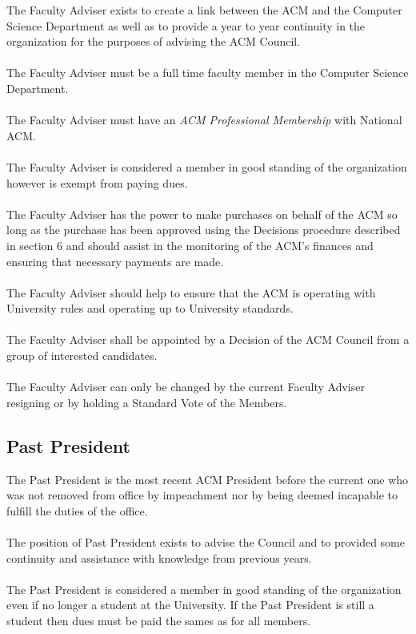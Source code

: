 \documentclass[12pt,titlepage]{article}
\begin{document}
The Faculty Adviser exists to create a link between the ACM and the Computer Science Department as well as to provide a year to year continuity in the organization for the purposes of advising the ACM Council.\\
\\
The Faculty Adviser must be a full time faculty member in the Computer Science Department.\\
\\
The Faculty Adviser must have an \emph{ACM Professional Membership} with National ACM.\\
\\
The Faculty Adviser is considered a member in good standing of the organization however is exempt from paying dues.\\
\\
The Faculty Adviser has the power to make purchases on behalf of the ACM so long as the purchase has been approved using the Decisions procedure described in section 6 and should assist in the monitoring of the ACM's finances and ensuring that necessary payments are made.\\
\\
The Faculty Adviser should help to ensure that the ACM is operating with University rules and operating up to University standards.\\
\\
The Faculty Adviser shall be appointed by a Decision of the ACM Council from a group of interested candidates.\\
\\
The Faculty Adviser can only be changed by the current Faculty Adviser resigning or by holding a Standard Vote of the Members.

\subsection{Past President}

The Past President is the most recent ACM President before the current one who was not removed from office by impeachment nor by being deemed incapable to fulfill the duties of the office.\\
\\
The position of Past President exists to advise the Council and to provided some continuity and assistance with knowledge from previous years.\\
\\
The Past President is considered a member in good standing of the organization even if no longer a student at the University. If the Past President is still a student then dues must be paid the sames as for all members.
\end{document}
